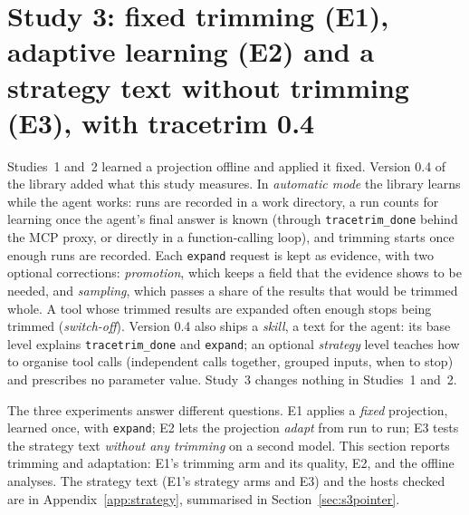 \section{Study 3: fixed trimming (E1), adaptive learning (E2) and a strategy text without trimming (E3), with tracetrim 0.4}
\label{sec:study3}

Studies~1 and~2 learned a projection offline and applied it fixed. Version 0.4 of the library added what this study
measures. In \emph{automatic mode} the library learns while the agent works: runs are recorded in a work directory,
a run counts for learning once the agent's final answer is known (through \texttt{tracetrim\_done} behind the MCP
proxy, or directly in a function-calling loop), and trimming starts once enough runs are recorded. Each
\texttt{expand} request is kept as evidence, with two optional corrections: \emph{promotion}, which keeps a field
that the evidence shows to be needed, and \emph{sampling}, which passes a share of the results that would be
trimmed whole. A tool whose trimmed results are expanded often enough stops being trimmed (\emph{switch-off}).
Version 0.4 also ships a \emph{skill}, a text for the agent: its base level explains \texttt{tracetrim\_done} and
\texttt{expand}; an optional \emph{strategy} level teaches how to organise tool calls (independent calls together,
grouped inputs, when to stop) and prescribes no parameter value. Study~3 changes nothing in Studies~1 and~2.

The three experiments answer different questions. E1 applies a \emph{fixed} projection, learned once, with
\texttt{expand}; E2 lets the projection \emph{adapt} from run to run; E3 tests the strategy text \emph{without any
trimming} on a second model. This section reports trimming and adaptation: E1's trimming arm and its quality, E2,
and the offline analyses. The strategy text (E1's strategy arms and E3) and the hosts checked are in
Appendix~\ref{app:strategy}, summarised in Section~\ref{sec:s3pointer}.

